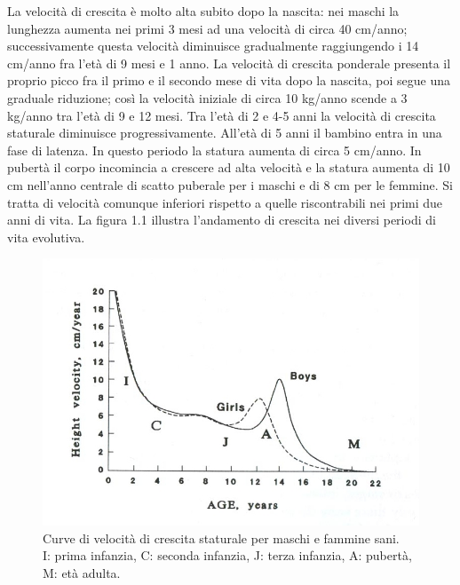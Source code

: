 La velocità di crescita è molto alta subito dopo la nascita: nei maschi la lunghezza aumenta nei primi 3 mesi ad una velocità di circa 40 cm/anno; successivamente questa velocità diminuisce gradualmente raggiungendo i 14 cm/anno fra l'età di 9 mesi e 1 anno. La velocità di crescita ponderale presenta il proprio picco fra il primo e il secondo mese di vita dopo la nascita, poi segue una graduale riduzione; così la velocità iniziale di circa 10 kg/anno scende a 3 kg/anno tra l'età di 9 e 12 mesi. Tra l'età di 2 e 4-5 anni la velocità di crescita staturale diminuisce progressivamente\cite{tanner1994growth}.
 All'età di 5 anni il bambino entra in una fase di latenza. In questo periodo la statura aumenta di circa 5 cm/anno. In pubertà il corpo incomincia a crescere ad alta velocità e la statura aumenta di 10 cm nell'anno centrale di scatto puberale per i maschi e di 8 cm per le femmine. Si tratta di velocità comunque inferiori rispetto a quelle riscontrabili nei primi due anni di vita.
 La figura 1.1 illustra l'andamento di crescita nei diversi periodi di vita evolutiva.
 
\begin{figure}[!h]
  \begin{center}
      \includegraphics{grafici/grafico_velocita} %
  \end{center}
  \caption{Curve di velocità di crescita staturale per maschi e fammine sani.\\I: prima infanzia, C: seconda infanzia, J: terza infanzia, A: pubertà, M: età adulta. \cite{bogin1996evolution} }
  \label{fig:GraficoVelocita}
\end{figure}
 
